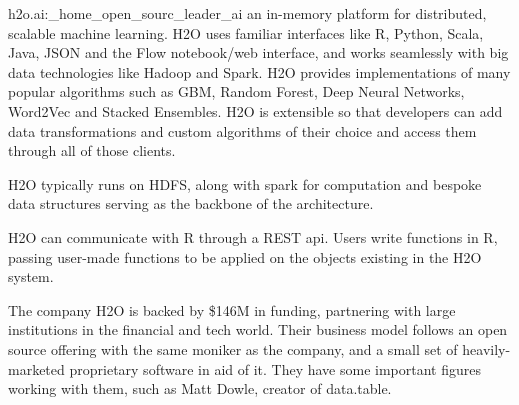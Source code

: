 \documentclass[10pt,a4paper]{article}
\begin{document}
\begin{displaycquote}{h2o.ai:_home_open_sourc_leader_ai}
	an in-memory platform for distributed, scalable machine learning.
	H2O uses familiar interfaces like R, Python, Scala, Java, JSON and
	the Flow notebook/web interface, and works seamlessly with big data
	technologies like Hadoop and Spark. H2O provides implementations of
	many popular algorithms such as GBM, Random Forest, Deep Neural
	Networks, Word2Vec and Stacked Ensembles. H2O is extensible so that
	developers can add data transformations and custom algorithms of
	their choice and access them through all of those clients.
\end{displaycquote}

H2O typically runs on HDFS, along with spark for computation and
bespoke data structures serving as the backbone of the architecture.

H2O can communicate with R through a REST api. Users write functions
in R, passing user-made functions to be applied on the objects
existing in the H2O system\cite{h2o.ai:_h2o}.

The company H2O is backed by \$146M in funding, partnering with large
institutions in the financial and tech world. Their business model
follows an open source offering with the same moniker as the company,
and a small set of heavily-marketed proprietary software in aid of it.
They have some important figures working with them, such as Matt
Dowle, creator of data.table.

\printbibliography{}
\end{document}
